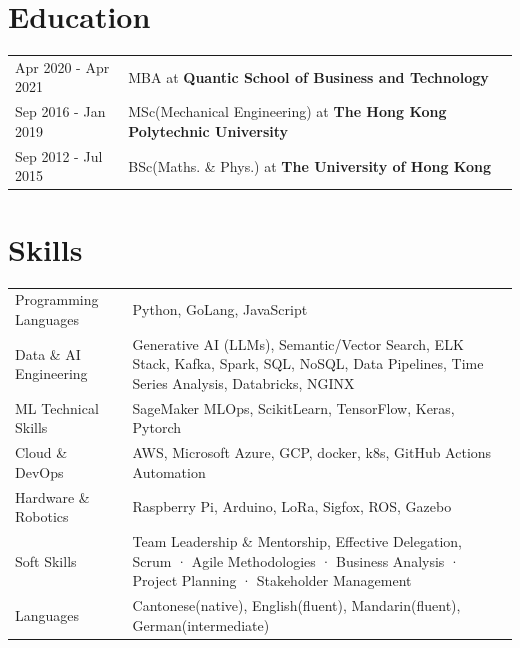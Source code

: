 \documentclass[a4paper,12pt]{article}
\begin{document}
\section{Education}
\begin{tabularx}{\linewidth}{@{}l X@{}}	
Apr 2020 - Apr 2021 & MBA at  \textbf{Quantic School of Business and Technology} \\

Sep 2016 - Jan 2019 & MSc(Mechanical Engineering) at \textbf{The Hong Kong Polytechnic University} \\ 

Sep 2012 - Jul 2015 & BSc(Maths. \& Phys.) at \textbf{The University of Hong Kong} \\

\end{tabularx}


\section{Skills}
\begin{tabularx}{\linewidth}{@{}l X@{}}
Programming Languages & \normalsize{Python, GoLang, JavaScript}\\
Data \& AI Engineering &  \normalsize{Generative AI (LLMs), Semantic/Vector Search, ELK Stack, Kafka, Spark, SQL, NoSQL, Data Pipelines, Time Series Analysis, Databricks, NGINX}\\
ML Technical Skills & \normalsize{SageMaker MLOps, ScikitLearn, TensorFlow, Keras, Pytorch} \\
Cloud \& DevOps &  \normalsize{AWS, Microsoft Azure, GCP, docker, k8s, GitHub Actions Automation}\\
Hardware \& Robotics & \normalsize{Raspberry Pi, Arduino, LoRa, Sigfox, ROS, Gazebo}\\
Soft Skills  &  \normalsize{Team Leadership \& Mentorship, Effective Delegation, Scrum · Agile Methodologies · Business Analysis · Project Planning · Stakeholder Management}\\  
Languages & \normalsize{Cantonese(native), English(fluent), Mandarin(fluent), German(intermediate)}
\end{tabularx}

\vfill
{}
\end{document}
